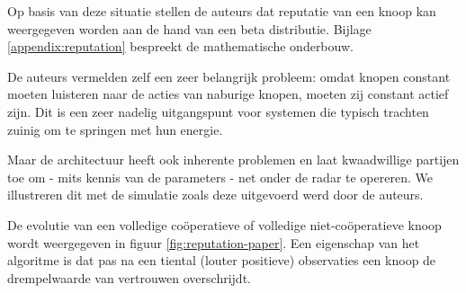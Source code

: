 Op basis van deze situatie stellen de auteurs dat reputatie van een knoop kan
weergegeven worden aan de hand van een beta distributie. Bijlage
\ref{appendix:reputation} bespreekt de mathematische onderbouw.

De auteurs vermelden zelf een zeer belangrijk probleem: omdat knopen constant
moeten luisteren naar de acties van naburige knopen, moeten zij constant actief
zijn. Dit is een zeer nadelig uitgangspunt voor systemen die typisch trachten
zuinig om te springen met hun energie.

Maar de architectuur heeft ook inherente problemen en laat kwaadwillige
partijen toe om - mits kennis van de parameters - net onder de radar te
opereren. We illustreren dit met de simulatie zoals deze uitgevoerd werd door
de auteurs.

De evolutie van een volledige co\"operatieve of volledige niet-co\"operatieve
knoop wordt weergegeven in figuur \ref{fig:reputation-paper}. Een eigenschap
van het algoritme is dat pas na een tiental (louter positieve) observaties een
knoop de drempelwaarde van vertrouwen overschrijdt.

